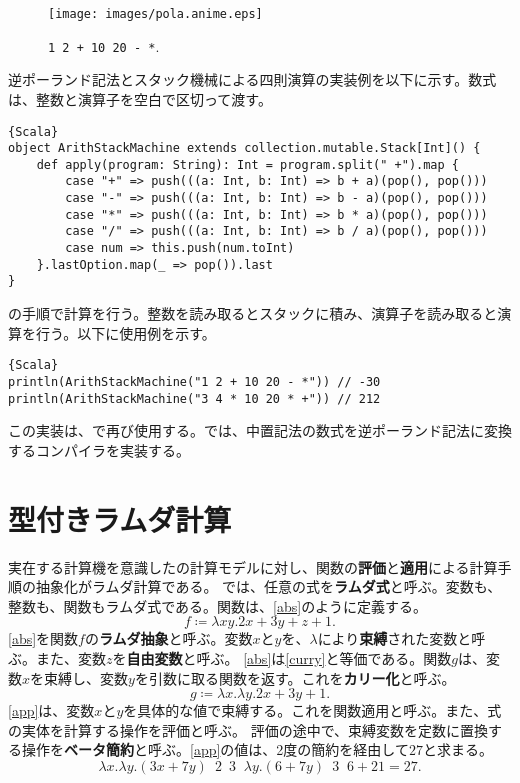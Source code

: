 \documentclass[10pt,a4paper]{book}
\DeclareMathOperator*{\app}{\enspace\xrightarrow[\beta]{}\enspace}
\begin{document}
\begin{figure}[h]
\centering
\texttt{[image: images/pola.anime.eps]}
\caption{\texttt{1 2 + 10 20 - *}.\label{fig:math}}
\end{figure}

逆ポーランド記法とスタック機械による四則演算の実装例を以下に示す。数式は、整数と演算子を空白で区切って渡す。

\begin{Verbatim}{Scala}
object ArithStackMachine extends collection.mutable.Stack[Int]() {
	def apply(program: String): Int = program.split(" +").map {
		case "+" => push(((a: Int, b: Int) => b + a)(pop(), pop()))
		case "-" => push(((a: Int, b: Int) => b - a)(pop(), pop()))
		case "*" => push(((a: Int, b: Int) => b * a)(pop(), pop()))
		case "/" => push(((a: Int, b: Int) => b / a)(pop(), pop()))
		case num => this.push(num.toInt)
	}.lastOption.map(_ => pop()).last
}
\end{Verbatim}

の手順で計算を行う。整数を読み取るとスタックに積み、演算子を読み取ると演算を行う。以下に使用例を示す。

\begin{Verbatim}{Scala}
println(ArithStackMachine("1 2 + 10 20 - *")) // -30
println(ArithStackMachine("3 4 * 10 20 * +")) // 212
\end{Verbatim}

この実装は、で再び使用する。では、中置記法の数式を逆ポーランド記法に変換するコンパイラを実装する。

\chapter{型付きラムダ計算\label{chap:lambda}}

実在する計算機を意識したの計算モデルに対し、関数の\textbf{評価}と\textbf{適用}による計算手順の抽象化がラムダ計算である。
では、任意の式を\textbf{ラムダ式}と呼ぶ。変数も、整数も、関数もラムダ式である。関数は、\eqref{abs}のように定義する。
%
\begin{equation}
\label{eq:abs}
f \coloneqq \lambda xy.2x+3y+z+1.
\end{equation}
%
\eqref{abs}を関数$f$の\textbf{ラムダ抽象}と呼ぶ。変数$x$と$y$を、$\lambda$により\textbf{束縛}された変数と呼ぶ。また、変数$z$を\textbf{自由変数}と呼ぶ。
\eqref{abs}は\eqref{curry}と等価である。関数$g$は、変数$x$を束縛し、変数$y$を引数に取る関数を返す。これを\textbf{カリー化}と呼ぶ。
%
\begin{equation}
\label{eq:curry}
g \coloneqq \lambda x.\lambda y.2x+3y+1.
\end{equation}
%
\eqref{app}は、変数$x$と$y$を具体的な値で束縛する。これを関数適用と呼ぶ。また、式の実体を計算する操作を評価と呼ぶ。
評価の途中で、束縛変数を定数に置換する操作を\textbf{ベータ簡約}と呼ぶ。\eqref{app}の値は、2度の簡約を経由して$27$と求まる。
%
\begin{equation}
\label{eq:app}
\lambda x.\lambda y.(3x+7y) \enspace 2 \enspace 3 \app \lambda y.(6+7y) \enspace 3 \app 6+21 = 27.
\end{equation}
\end{document}
